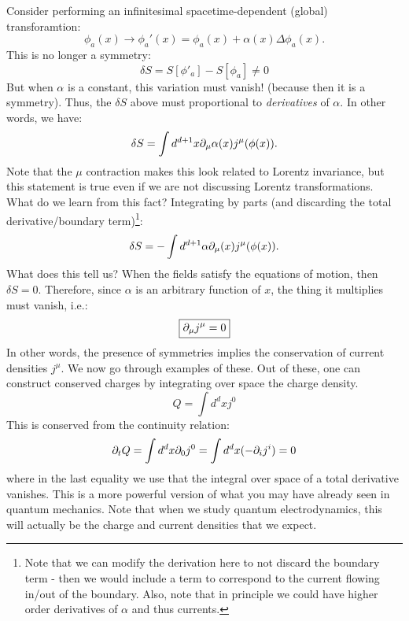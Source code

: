 Consider performing an infinitesimal spacetime-dependent (global) transforamtion:
\begin{equation}
    \phi_a(x) \to \phi_a'(x) = \phi_a(x) + \alpha(x)\Delta\phi_a(x).
\end{equation}
This is no longer a symmetry:
\begin{equation}
    \delta S = S[\phi'_a] - S[\phi_a] \neq 0
\end{equation}
But when $\alpha$ is a constant, this variation must vanish! (because then it is a symmetry). Thus, the $\delta S$ above must proportional to \emph{derivatives} of $\alpha$. In other words, we have:
\begin{equation}
    \delta S = \int d^{d+1}x \partial_\mu \alpha(x) j^\mu(\phi(x)).
\end{equation}
Note that the $\mu$ contraction makes this look related to Lorentz invariance, but this statement is true even if we are not discussing Lorentz transformations. What do we learn from this fact? Integrating by parts (and discarding the total derivative/boundary term)\footnote{Note that we can modify the derivation here to not discard the boundary term - then we would include a term to correspond to the current flowing in/out of the boundary. Also, note that in principle we could have higher order derivatives of $\alpha$ and thus currents.}:
\begin{equation}
    \delta S = -\int d^{d+1}\alpha \partial_\mu(x) j^\mu(\phi(x)).
\end{equation}
What does this tell us? When the fields satisfy the equations of motion, then $\delta S = 0$. Therefore, since $\alpha$ is an arbitrary function of $x$, the thing it multiplies must vanish, i.e.:
\begin{equation}
    \boxed{\partial_\mu j^\mu = 0}
\end{equation}
In other words, the presence of symmetries implies the conservation of current densities $j^\mu$. We now go through examples of these. Out of these, one can construct conserved charges by integrating over space the charge density.
\begin{equation}
    Q = \int d^dx j^0
\end{equation}
This is conserved from the continuity relation:
\begin{equation}
    \partial_t Q = \int d^d x \partial_0 j^0 = \int d^dx (-\partial_i j^i) = 0
\end{equation}
where in the last equality we use that the integral over space of a total derivative vanishes. This is a more powerful version of what you may have already seen in quantum mechanics. Note that when we study quantum electrodynamics, this will actually be the charge and current densities that we expect.

